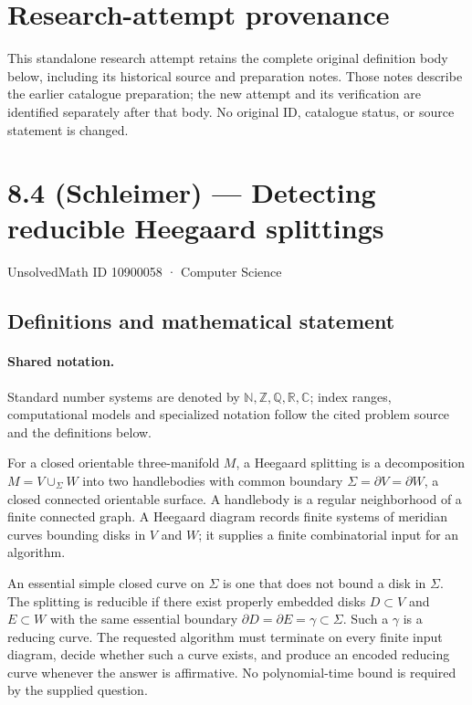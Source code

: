 \documentclass[11pt]{article}
\begin{document}
\section*{Research-attempt provenance}
This standalone research attempt retains the complete original definition body below,
including its historical source and preparation notes. Those notes describe the
earlier catalogue preparation; the new attempt and its verification are identified
separately after that body. No original ID, catalogue status, or source statement is changed.

\section{8.4 (Schleimer) — Detecting reducible Heegaard splittings}\label{10900058}
{\small UnsolvedMath ID 10900058 · Computer Science}
\subsection{Definitions and mathematical statement}

\paragraph{Shared notation.}Standard number systems are denoted by $\mathbb N,\mathbb Z,\mathbb Q,\mathbb R,\mathbb C$; index ranges, computational models and specialized notation follow the cited problem source and the definitions below.


For a closed orientable three-manifold $M$, a Heegaard splitting is a decomposition $M=V\cup_\Sigma W$ into two handlebodies with common boundary $\Sigma=\partial V=\partial W$, a closed connected orientable surface. A handlebody is a regular neighborhood of a finite connected graph. A Heegaard diagram records finite systems of meridian curves bounding disks in $V$ and $W$; it supplies a finite combinatorial input for an algorithm.

An essential simple closed curve on $\Sigma$ is one that does not bound a disk in $\Sigma$. The splitting is reducible if there exist properly embedded disks $D\subset V$ and $E\subset W$ with the same essential boundary $\partial D=\partial E=\gamma\subset\Sigma$. Such a $\gamma$ is a reducing curve. The requested algorithm must terminate on every finite input diagram, decide whether such a curve exists, and produce an encoded reducing curve whenever the answer is affirmative. No polynomial-time bound is required by the supplied question.
\end{document}
